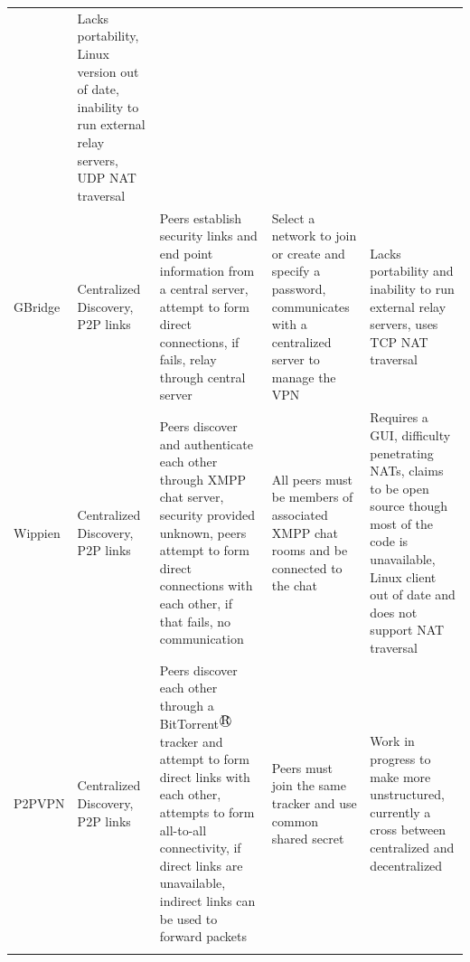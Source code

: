 \begin{center}
{{\begin{longtable}{p{.8in}p{1.15in}p{1.3in}p{1.25in}p{1.25in}}
&
Lacks portability, Linux version out of date, inability to run external relay
servers, UDP NAT traversal
\\
GBridge
&
Centralized Discovery, P2P links
&
Peers establish security links and end point information from a central
server, attempt to form direct connections, if fails, relay through central
server
&
Select a network to join or create and specify a password, communicates with a
centralized server to manage the VPN
&
Lacks portability and inability to run external relay servers, uses TCP NAT
traversal
\\
Wippien
&
Centralized Discovery, P2P links
&
Peers discover and authenticate each other through XMPP chat server, security
provided unknown, peers attempt to form direct connections with each other, if
that fails, no communication
&
All peers must be members of associated XMPP chat rooms and be connected to the
chat
&
Requires a GUI, difficulty penetrating NATs, claims to be open source though
most of the code is unavailable, Linux client out of date and does not support
NAT traversal
\\
P2PVPN
&
Centralized Discovery, P2P links
&
Peers discover each other through a BitTorrent$^\registered$ tracker and attempt to form
direct links with each other, attempts to form all-to-all connectivity, if
direct links are unavailable, indirect links can be used to forward packets
&
Peers must join the same tracker and use common shared secret
&
Work in progress to make more unstructured, currently a cross between
centralized and decentralized
\\ \hline
\label{tab:virtual_networks}
\end{longtable} } }
\end{center}
